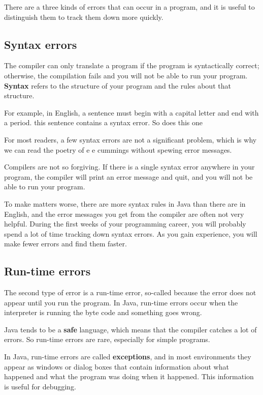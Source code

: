 \documentclass[12pt]{book}
\theoremstyle{exercise}
\begin{document}
There are a three kinds of errors that can occur
in a program, and it is useful to distinguish them
to track them down more quickly.

\subsection{Syntax errors}

The compiler can only translate a program if the program is
syntactically correct; otherwise, the compilation fails and
you will not be able to run your program.  {\bf Syntax}
refers to the structure of your program and the rules about
that structure.

For example, in English, a sentence must begin with a capital
letter and end with a period.  this sentence contains a syntax
error.  So does this one

For most readers, a few syntax errors are not a significant
problem, which is why we can read the poetry of e e cummings
without spewing error messages.

Compilers are not so forgiving.  If there is a single syntax
error anywhere in your program, the compiler will print an
error message and quit, and you will not be able to run
your program.

To make matters worse, there are more syntax rules in Java
than there are in English, and the error messages you get from
the compiler are often not very helpful.  During the first
weeks of your programming career, you will probably
spend a lot of time tracking down syntax errors.  As you
gain experience, you will make fewer errors and find
them faster.

\subsection{Run-time errors}
\label{run-time}

The second type of error is a run-time error, so-called because
the error does not appear until you run the program.  In Java,
run-time errors occur when the interpreter is running the byte
code and something goes wrong.

Java tends to be a {\bf safe}
language, which means that the compiler catches a lot of errors.
So run-time errors are rare, especially
for simple programs.

In Java, run-time errors are called {\bf exceptions},
and in most environments they appear as windows or dialog
boxes that contain information about what happened and what
the program was doing when it happened.  This information is
useful for debugging.
\end{document}
